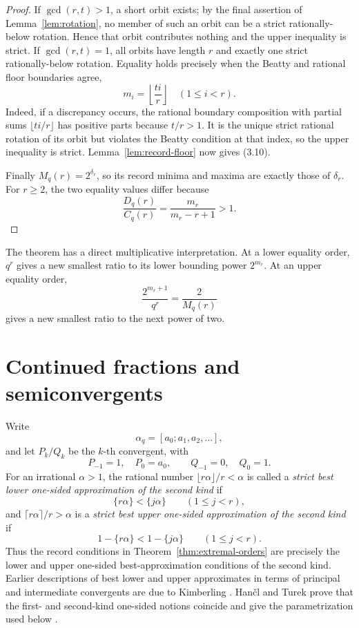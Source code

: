 \documentclass[11pt]{article}
\begin{document}
\begin{proof}
If \(\gcd(r,t)>1\), a short orbit exists; by the final assertion of
Lemma~\ref{lem:rotation}, no member of such an orbit can be a strict
rationally-below rotation. Hence that orbit contributes nothing and the
upper inequality is strict. If \(\gcd(r,t)=1\), all orbits have length
\(r\) and exactly one strict rationally-below rotation. Equality holds
precisely when the Beatty and rational floor boundaries agree,
\[
 m_i=\left\lfloor\frac{ti}{r}\right\rfloor
 \quad(1\leq i<r).
\]
Indeed, if a discrepancy occurs, the rational boundary composition with
partial sums \(\lfloor ti/r\rfloor\) has positive parts because \(t/r>1\).
It is the unique strict rational rotation
of its orbit but violates the Beatty condition at that index, so the upper
inequality is strict. Lemma~\ref{lem:record-floor} now gives (3.10).

Finally \(M_q(r)=2^{\delta_r}\), so its record minima and maxima are exactly
those of \(\delta_r\). For \(r\geq2\), the two equality values differ
because
\[
 \frac{D_q(r)}{C_q(r)}=
 \frac{m_r}{m_r-r+1}>1.
\]
\end{proof}

The theorem has a direct multiplicative interpretation. At a lower equality
order, \(q^r\) gives a new smallest ratio to its lower bounding power
\(2^{m_r}\). At an upper equality order,
\[
 \frac{2^{m_r+1}}{q^r}=\frac{2}{M_q(r)}
\]
gives a new smallest ratio to the next power of two.

\section{Continued fractions and semiconvergents}
\label{sec:cf}

Write
\[
 \alpha_q=[a_0;a_1,a_2,\ldots],
\]
and let \(P_k/Q_k\) be the \(k\)-th convergent, with
\[
 P_{-1}=1,\quad P_0=a_0,
 \qquad
 Q_{-1}=0,\quad Q_0=1.
\]
For an irrational \(\alpha>1\), the rational number
\(\lfloor r\alpha\rfloor/r<\alpha\) is called a \emph{strict best
lower one-sided approximation of the second kind} if
\[
 \{r\alpha\}<\{j\alpha\}
 \qquad(1\leq j<r),
\]
and \(\lceil r\alpha\rceil/r>\alpha\) is a \emph{strict best upper
one-sided approximation of the second kind} if
\[
 1-\{r\alpha\}<1-\{j\alpha\}
 \qquad(1\leq j<r).
\]
Thus the record conditions in Theorem~\ref{thm:extremal-orders} are
precisely the lower and upper one-sided best-approximation conditions of
the second kind. Earlier descriptions of best lower and upper approximates
in terms of principal and intermediate convergents are due to Kimberling
\cite{Kimberling97}. Han\v{c}l and Turek prove that the first- and
second-kind one-sided notions coincide and give the parametrization used
below \cite[Theorem~4.5]{HanclTurek}.
\end{document}
